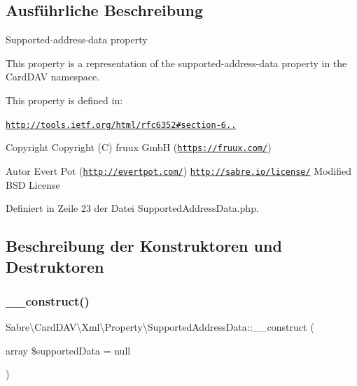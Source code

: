 \subsection{Ausführliche Beschreibung}
Supported-\/address-\/data property

This property is a representation of the supported-\/address-\/data property in the Card\+D\+AV namespace.

This property is defined in\+:

\href{http://tools.ietf.org/html/rfc6352#section-6.2.2}{\tt http\+://tools.\+ietf.\+org/html/rfc6352\#section-\/6..}

\begin{DoxyCopyright}{Copyright}
Copyright (C) fruux GmbH (\href{https://fruux.com/}{\tt https\+://fruux.\+com/}) 
\end{DoxyCopyright}
\begin{DoxyAuthor}{Autor}
Evert Pot (\href{http://evertpot.com/}{\tt http\+://evertpot.\+com/})  \href{http://sabre.io/license/}{\tt http\+://sabre.\+io/license/} Modified B\+SD License 
\end{DoxyAuthor}


Definiert in Zeile 23 der Datei Supported\+Address\+Data.\+php.



\subsection{Beschreibung der Konstruktoren und Destruktoren}
\mbox{\label{class_sabre_1_1_card_d_a_v_1_1_xml_1_1_property_1_1_supported_address_data_abe196dc4a6c08418ef0410d419db8eb7}} 
\subsubsection{\texorpdfstring{\+\_\+\+\_\+construct()}{\_\_construct()}}
{\footnotesize\ttfamily Sabre\textbackslash{}\+Card\+D\+A\+V\textbackslash{}\+Xml\textbackslash{}\+Property\textbackslash{}\+Supported\+Address\+Data\+::\+\_\+\+\_\+construct (\begin{DoxyParamCaption}\item[{array}]{\$supported\+Data = {\ttfamily null} }\end{DoxyParamCaption})}


